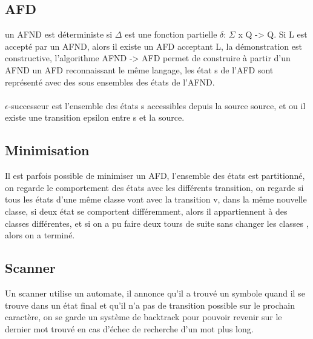 \documentclass{article}
\begin{document}
\subsection{AFD} un AFND est déterministe si $\Delta$ est une fonction partielle $\delta$: $\Sigma$ x Q -> Q. Si L est accepté par un AFND, alors il existe un AFD acceptant L, la démonstration est constructive, l'algorithme AFND -> AFD permet de construire à partir d'un AFND un AFD reconnaissant le même langage, les état s de l'AFD sont représenté avec des sous ensembles des états de l'AFND.\\\\$\epsilon$-successeur est l'ensemble des états s accessibles depuis la source source, et ou il existe une transition epsilon entre s et la source.
\subsection{Minimisation} Il est parfois possible de minimiser un AFD, l'ensemble des états  est partitionné, on regarde le comportement des états avec les différents transition, on regarde si tous les états d'une même classe vont avec la transition v, dans la même nouvelle classe, si deux état se comportent différemment, alors il appartiennent à des classes différentes, et si on a pu faire deux tours de suite sans changer les classes , alors on a terminé.
\subsection{Scanner} Un scanner utilise un automate, il annonce qu'il a trouvé un symbole quand il se trouve dans un état final et qu'il n'a pas de transition possible sur le prochain caractère, on se garde un système de backtrack pour pouvoir revenir sur le dernier mot trouvé en cas d'échec de recherche d'un mot plus long.
\end{document}
